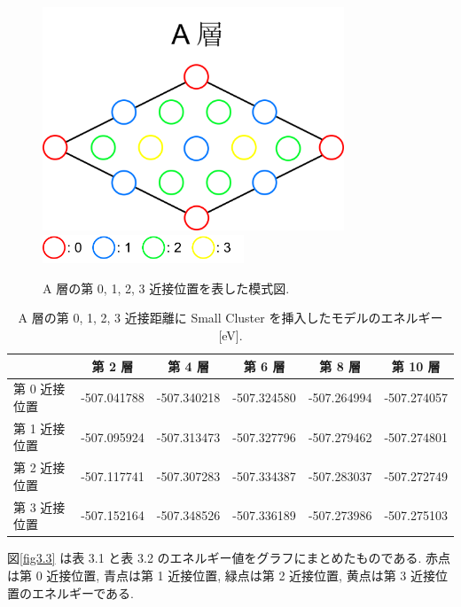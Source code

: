 \begin{figure}[htbp]
	\begin{center}
		\includegraphics[width=90mm]{../method/Alayer.png}
		\includegraphics[width=60mm]{../method/AClayer.png}
		\caption{A 層の第 0, 1, 2, 3 近接位置を表した模式図.}
		\label{fig3.2}
	\end{center}
\end{figure}

\begin{table}[htb]
\caption{A 層の第 0, 1, 2, 3 近接距離に Small Cluster を挿入したモデルのエネルギー [eV].}
  \begin{center}
    \begin{tabular}{|l|c|c|c|c|c|} \hline
         & 第 2 層 & 第 4 層 & 第 6 層 & 第 8 層 & 第 10 層\\ \hline
第 0 近接位置 & -507.041788 & -507.340218 & -507.324580 & -507.264994 & -507.274057\\
\hline
第 1 近接位置 & -507.095924 & -507.313473 & -507.327796 & -507.279462 & -507.274801\\
\hline
第 2 近接位置 & -507.117741 & -507.307283 & -507.334387 & -507.283037 & -507.272749\\
\hline
第 3 近接位置 & -507.152164 & -507.348526 & -507.336189 & -507.273986 & -507.275103\\
\hline
    \end{tabular}
  \end{center}
\end{table}

図\ref{fig3.3} は表 3.1 と表 3.2 のエネルギー値をグラフにまとめたものである. 赤点は第 0 近接位置, 青点は第 1 近接位置, 緑点は第 2 近接位置, 黄点は第 3 近接位置のエネルギーである.

